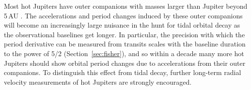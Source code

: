 \documentclass[12pt,twocolumn,tighten]{aastex62}
\begin{document}
Most hot Jupiters have outer companions with masses larger than
Jupiter beyond 5$\,$AU
\citep{knutson_friends_2014,bryan_statistics_2016}. The accelerations
and period changes induced by these outer companions will become an
increasingly large nuisance in the hunt for tidal orbital decay as the
observational baselines get longer.  In particular, the precision with
which the period derivative can be measured from transits scales with
the baseline duration to the power of 5/2 (Section~\ref{sec:fisher}), and
so within a decade many more hot Jupiters should show orbital period
changes due to accelerations from their outer companions.  
To distinguish this effect from tidal decay, further long-term radial
velocity measurements of hot Jupiters are strongly encouraged.


%
%
\end{document}
